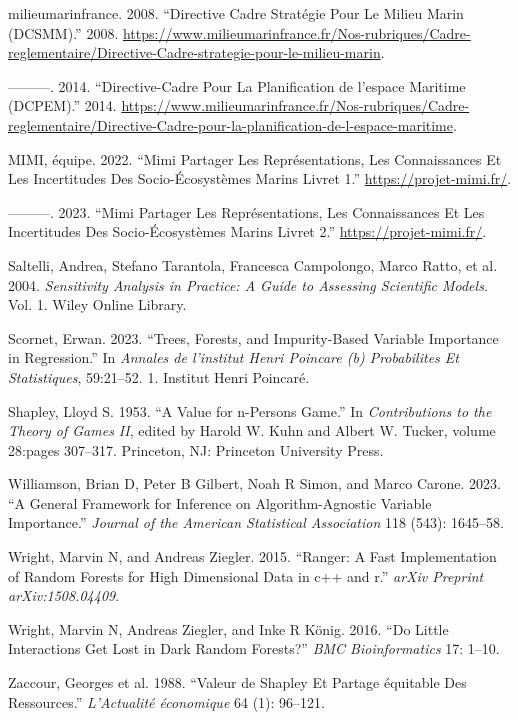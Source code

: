 \documentclass[
]{article}
\newlength{\cslhangindent}
\newlength{\cslentryspacingunit} %
\newenvironment{CSLReferences}[2] %
 {%
  \setlength{\parindent}{0pt}
  \ifodd #1
  \let\oldpar\par
  \def\par{\hangindent=\cslhangindent\oldpar}
  \fi
  \setlength{\parskip}{#2\cslentryspacingunit}
 }%
 {}
\begin{document}
\begin{CSLReferences}{1}{0}
\leavevmode{}%
milieumarinfrance. 2008. {``Directive Cadre Stratégie Pour Le Milieu
Marin (DCSMM).''} 2008.
\url{https://www.milieumarinfrance.fr/Nos-rubriques/Cadre-reglementaire/Directive-Cadre-strategie-pour-le-milieu-marin}.

\leavevmode{}%
---------. 2014. {``Directive-Cadre Pour La Planification de l'espace
Maritime (DCPEM).''} 2014.
\url{https://www.milieumarinfrance.fr/Nos-rubriques/Cadre-reglementaire/Directive-Cadre-pour-la-planification-de-l-espace-maritime}.

\leavevmode{}%
MIMI, équipe. 2022. {``Mimi Partager Les Représentations, Les
Connaissances Et Les Incertitudes Des Socio-Écosystèmes Marins Livret
1.''} \url{https://projet-mimi.fr/}.

\leavevmode{}%
---------. 2023. {``Mimi Partager Les Représentations, Les Connaissances
Et Les Incertitudes Des Socio-Écosystèmes Marins Livret 2.''}
\url{https://projet-mimi.fr/}.

\leavevmode{}%
Saltelli, Andrea, Stefano Tarantola, Francesca Campolongo, Marco Ratto,
et al. 2004. \emph{Sensitivity Analysis in Practice: A Guide to
Assessing Scientific Models}. Vol. 1. Wiley Online Library.

\leavevmode{}%
Scornet, Erwan. 2023. {``Trees, Forests, and Impurity-Based Variable
Importance in Regression.''} In \emph{Annales de l'institut Henri
Poincare (b) Probabilites Et Statistiques}, 59:21--52. 1. Institut Henri
Poincar{é}.

\leavevmode{}%
Shapley, Lloyd S. 1953. {``A Value for n-Persons Game.''} In
\emph{Contributions to the Theory of Games II}, edited by Harold W. Kuhn
and Albert W. Tucker, volume 28:pages 307--317. Princeton, NJ: Princeton
University Press.

\leavevmode{}%
Williamson, Brian D, Peter B Gilbert, Noah R Simon, and Marco Carone.
2023. {``A General Framework for Inference on Algorithm-Agnostic
Variable Importance.''} \emph{Journal of the American Statistical
Association} 118 (543): 1645--58.

\leavevmode{}%
Wright, Marvin N, and Andreas Ziegler. 2015. {``Ranger: A Fast
Implementation of Random Forests for High Dimensional Data in c++ and
r.''} \emph{arXiv Preprint arXiv:1508.04409}.

\leavevmode{}%
Wright, Marvin N, Andreas Ziegler, and Inke R König. 2016. {``Do Little
Interactions Get Lost in Dark Random Forests?''} \emph{BMC
Bioinformatics} 17: 1--10.

\leavevmode{}%
Zaccour, Georges et al. 1988. {``Valeur de Shapley Et Partage
{é}quitable Des Ressources.''} \emph{L'Actualit{é} {é}conomique} 64 (1):
96--121.

\end{CSLReferences}
\end{document}
